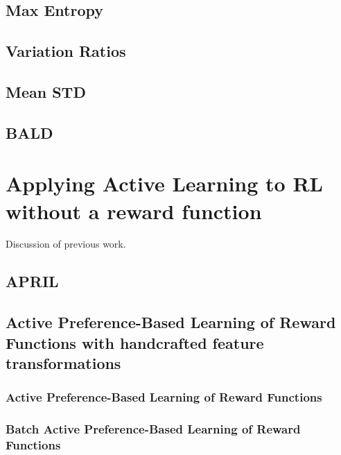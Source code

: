 \documentclass[11pt, a4paper, bibliography=totoc]{report}
\begin{document}
\subsection{Max Entropy}

\subsection{Variation Ratios}

\subsection{Mean STD}

\subsection{BALD}

\section{Applying Active Learning to RL without a reward function}
Discussion of previous work.

\subsection{APRIL}

\subsection{Active Preference-Based Learning of Reward Functions with handcrafted feature transformations}

\subsubsection{Active Preference-Based Learning of Reward Functions}

\subsubsection{Batch Active Preference-Based Learning of Reward Functions}
\end{document}
